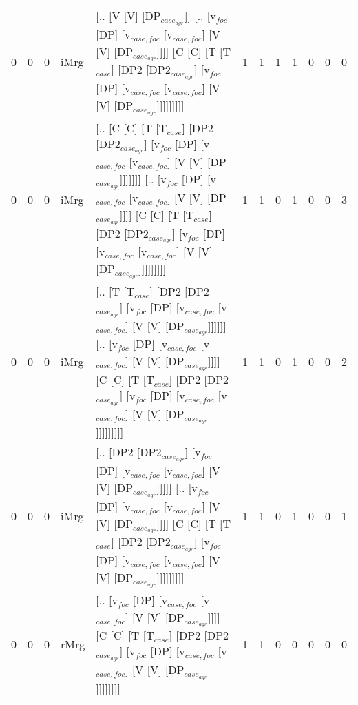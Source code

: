 \begin{tabularx}{\linewidth}{rrrlXrrrrrrr}
   0 &       0 &   0 & iMrg & [.. [V [V] [DP$_{case_{agr}}$]] [.. [v$_{foc}$ [DP] [v$_{case,foc}$ [v$_{case,foc}$] [V [V] [DP$_{case_{agr}}$]]]] [C [C] [T [T$_{case}$] [DP2 [DP2$_{case_{agr}}$] [v$_{foc}$ [DP] [v$_{case,foc}$ [v$_{case,foc}$] [V [V] [DP$_{case_{agr}}$]]]]]]]]]                                                                                  &             1 &             1 &                  1 &            1 &              0 &             0 &          0 \\
   0 &       0 &   0 & iMrg & [.. [C [C] [T [T$_{case}$] [DP2 [DP2$_{case_{agr}}$] [v$_{foc}$ [DP] [v$_{case,foc}$ [v$_{case,foc}$] [V [V] [DP$_{case_{agr}}$]]]]]]] [.. [v$_{foc}$ [DP] [v$_{case,foc}$ [v$_{case,foc}$] [V [V] [DP$_{case_{agr}}$]]]] [C [C] [T [T$_{case}$] [DP2 [DP2$_{case_{agr}}$] [v$_{foc}$ [DP] [v$_{case,foc}$ [v$_{case,foc}$] [V [V] [DP$_{case_{agr}}$]]]]]]]]] &             1 &             1 &                  0 &            1 &              0 &             0 &          3 \\
   0 &       0 &   0 & iMrg & [.. [T [T$_{case}$] [DP2 [DP2$_{case_{agr}}$] [v$_{foc}$ [DP] [v$_{case,foc}$ [v$_{case,foc}$] [V [V] [DP$_{case_{agr}}$]]]]]] [.. [v$_{foc}$ [DP] [v$_{case,foc}$ [v$_{case,foc}$] [V [V] [DP$_{case_{agr}}$]]]] [C [C] [T [T$_{case}$] [DP2 [DP2$_{case_{agr}}$] [v$_{foc}$ [DP] [v$_{case,foc}$ [v$_{case,foc}$] [V [V] [DP$_{case_{agr}}$]]]]]]]]]         &             1 &             1 &                  0 &            1 &              0 &             0 &          2 \\
   0 &       0 &   0 & iMrg & [.. [DP2 [DP2$_{case_{agr}}$] [v$_{foc}$ [DP] [v$_{case,foc}$ [v$_{case,foc}$] [V [V] [DP$_{case_{agr}}$]]]]] [.. [v$_{foc}$ [DP] [v$_{case,foc}$ [v$_{case,foc}$] [V [V] [DP$_{case_{agr}}$]]]] [C [C] [T [T$_{case}$] [DP2 [DP2$_{case_{agr}}$] [v$_{foc}$ [DP] [v$_{case,foc}$ [v$_{case,foc}$] [V [V] [DP$_{case_{agr}}$]]]]]]]]]                      &             1 &             1 &                  0 &            1 &              0 &             0 &          1 \\
   0 &       0 &   0 & rMrg & [.. [v$_{foc}$ [DP] [v$_{case,foc}$ [v$_{case,foc}$] [V [V] [DP$_{case_{agr}}$]]]] [C [C] [T [T$_{case}$] [DP2 [DP2$_{case_{agr}}$] [v$_{foc}$ [DP] [v$_{case,foc}$ [v$_{case,foc}$] [V [V] [DP$_{case_{agr}}$]]]]]]]]                                                                                                             &             1 &             1 &                  0 &            0 &              0 &             0 &          0 \\
\hline
\end{tabularx}\endgroup\\
